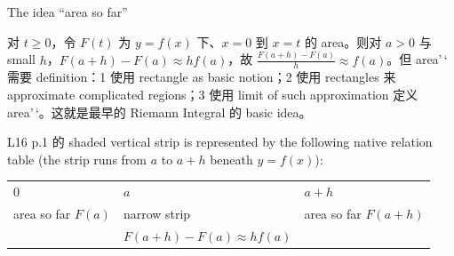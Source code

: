 \begin{qlremark}{The idea ``area so far''}

对 \(t \geq 0\)，令 \(F(t)\) 为 \(y = f(x)\) 下、\(x = 0\) 到 \(x = t\) 的 area。则对 \(a > 0\) 与 small \(h\)，\(F\left( {a + h} \right) - F(a) \approx hf(a)\)，故 \(\frac{F\left( {a + h} \right) - F(a)}{h} \approx f(a)\)。但 area'\,` 需要 definition：1 使用 rectangle as basic notion；2 使用 rectangles 来 approximate complicated regions；3 使用 limit of such approximation 定义 area'\,`。这就是最早的 Riemann Integral 的 basic idea。

L16 p.1 的 shaded vertical strip is represented by the following native relation table (the strip runs from \(a\) to \(a + h\) beneath \(y = f(x)\)):

{\def\LTcaptype{none} %
\begin{longtable}[]{@{}lll@{}}
\toprule\noalign{}
\endhead
\bottomrule\noalign{}
\endlastfoot
\(0\) & \(a\) & \(a + h\) \\
area so far \(F(a)\) & narrow strip & area so far \(F\left( {a + h} \right)\) \\
& \(F\left( {a + h} \right) - F(a) \approx hf(a)\) & \\
\end{longtable}
}

\end{qlremark}

